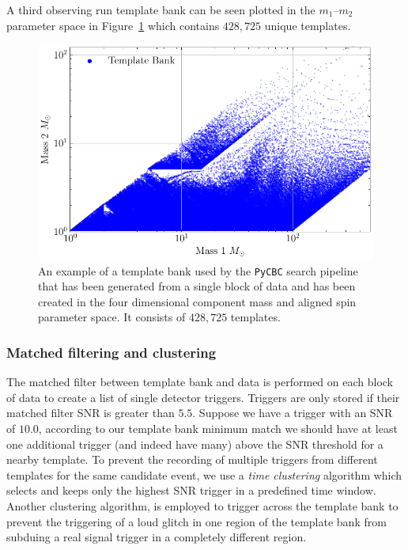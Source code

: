 A third observing run template bank can be seen plotted in the $m_{1}\text{--}m_{2}$ parameter space in Figure~\ref{2:fig:pycbc-o3-template-bank} which contains $428,725$ unique templates.
%
\begin{figure}
    \centering
    \includegraphics[width=0.75\linewidth]{images/2_searches/H1L1V1-PLOT_BANK.pdf}
    \caption{An example of a template bank used by the \texttt{PyCBC} search pipeline that has been generated from a single block of data and has been created in the four dimensional component mass and aligned spin parameter space. It consists of $428,725$ templates.}
    \label{2:fig:pycbc-o3-template-bank}
\end{figure}
%






\subsubsection{Matched filtering and clustering}

The matched filter between template bank and data is performed on each block of data to create a list of single detector triggers. Triggers are only stored if their matched filter SNR is greater than $5.5$. Suppose we have a trigger with an SNR of $10.0$, according to our template bank minimum match we should have at least one additional trigger (and indeed have many) above the SNR threshold for a nearby template. To prevent the recording of multiple triggers from different templates for the same candidate event, we use a \textit{time clustering} algorithm which selects and keeps only the highest SNR trigger in a predefined time window. Another clustering algorithm, is employed to trigger across the template bank to prevent the triggering of a loud glitch in one region of the template bank from subduing a real signal trigger in a completely different region.

